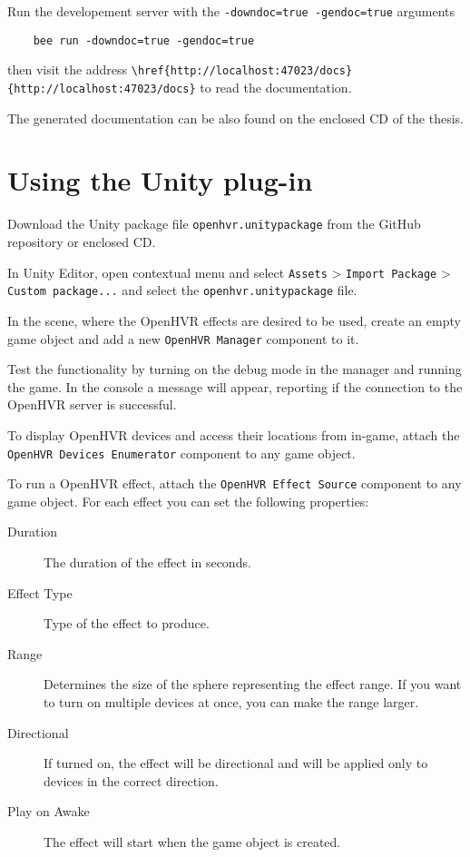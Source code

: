 Run the developement server with the \verb|-downdoc=true -gendoc=true| arguments

\begin{verbatim}
    bee run -downdoc=true -gendoc=true
\end{verbatim}

then visit the address \verb|\href{http://localhost:47023/docs}{http://localhost:47023/docs}| to read the
documentation.

The generated documentation can be also found on the enclosed CD of the thesis.

\section*{Using the Unity plug-in}

Download the Unity package file \verb|openhvr.unitypackage| from the GitHub
repository or enclosed CD.

In Unity Editor, open contextual menu and select 
\verb|Assets| > \verb|Import Package| > \verb|Custom package...| and select
the \verb|openhvr.unitypackage| file.

In the scene, where the OpenHVR effects are desired to be used, create an empty
game object and add a new \verb|OpenHVR Manager| component to it.

Test the functionality by turning on the debug mode in the manager and running
the game. In the console a message will appear, reporting if the connection
to the OpenHVR server is successful.

To display OpenHVR devices and access their locations from in-game, attach
the \verb|OpenHVR Devices Enumerator| component to any game object.

To run a OpenHVR effect, attach the \verb|OpenHVR Effect Source| component to
any game object. For each effect you can set the following properties:

\begin{description}
    \item[Duration] The duration of the effect in seconds.
    \item[Effect Type] Type of the effect to produce.
    \item[Range] Determines the size of the sphere representing the effect range.
    If you want to turn on multiple devices at once, you can make the range larger.
    \item[Directional] If turned on, the effect will be directional and will
    be applied only to devices in the correct direction.
    \item[Play on Awake] The effect will start when the game object is created.
\end{description}

